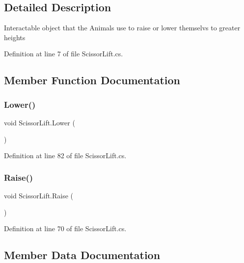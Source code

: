\subsection{Detailed Description}
Interactable object that the Animals use to raise or lower themselvs to greater heights 



Definition at line 7 of file Scissor\+Lift.\+cs.



\subsection{Member Function Documentation}
\mbox{\label{class_scissor_lift_ae039f48df315a5aa533d468ac5e45a5e}} 
\subsubsection{\texorpdfstring{Lower()}{Lower()}}
{\footnotesize\ttfamily void Scissor\+Lift.\+Lower (\begin{DoxyParamCaption}{ }\end{DoxyParamCaption})}



Definition at line 82 of file Scissor\+Lift.\+cs.

\mbox{\label{class_scissor_lift_a47374be94fb3d0f9a627c26deaec392b}} 
\subsubsection{\texorpdfstring{Raise()}{Raise()}}
{\footnotesize\ttfamily void Scissor\+Lift.\+Raise (\begin{DoxyParamCaption}{ }\end{DoxyParamCaption})}



Definition at line 70 of file Scissor\+Lift.\+cs.



\subsection{Member Data Documentation}
\mbox{\label{class_scissor_lift_a0154e3d3c0d4b52b280058a4338c8e60}} 
